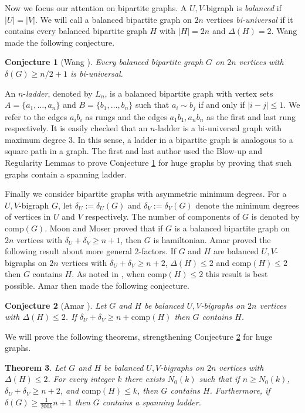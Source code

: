 \documentclass[oneside,12pt]{memoir}
\newtheorem{theorem}{Theorem}[section]
\newtheorem{conjecture}[theorem]{Conjecture}
\begin{document}
Now we focus our attention on bipartite graphs. A $U,V$-bigraph
is \emph{balanced} if $|U|=|V|$. We will call a balanced bipartite
graph on $2n$ vertices \emph{bi-universal} if it contains every balanced
bipartite graph $H$ with $|H|=2n$ and $\Delta(H)=2$. Wang made the following conjecture.

\begin{conjecture}[Wang \cite{W1}]
\label{con:W1}Every balanced bipartite graph $G$ on $2n$ vertices with
$\delta(G)\geq n/2+1$ is bi-universal.
\end{conjecture}
An $n$-\emph{ladder}, denoted by $L_n$, is a balanced bipartite graph with vertex sets
$A=\{ a_{1},\dots,a_{n}\}$ and $B=\{ b_{1},\dots,b_{n}\}$
such that $a_{i}\sim b_{j}$ if and only if $\left|i-j\right|\leq1$. We refer
to the edges $a_{i}b_{i}$ as rungs and the edges $a_{1}b_{1},a_{n}b_{n}$
as the first and last rung respectively. It is easily checked 
that an $n$-ladder is a bi-universal graph with maximum degree $3$.  In this sense, a ladder in a bipartite graph is analogous to a square path in a graph. The first and last author \cite{CK} used the Blow-up and Regularity
Lemmas to prove Conjecture \ref{con:W1} for huge graphs by
proving that such graphs contain a spanning ladder.

Finally we consider bipartite graphs with asymmetric minimum degrees.
For a $U,V$-bigraph $G$, let $\delta_U:=\delta_U(G)$ and $\delta_V:=\delta_V(G)$ denote the minimum
degrees of vertices in $U$ and $V$ respectively. The number of components
of $G$ is denoted by $\mathrm{comp}(G)$. Moon and Moser \cite{MM}
proved that if $G$ is a balanced bipartite graph on $2n$ vertices
with $\delta_{U}+\delta_{V}\geq n+1$, then $G$ is hamiltonian. Amar \cite{A} proved the following result about more general 2-factors.  If $G$ and $H$ are balanced
$U,V$-bigraphs on $2n$ vertices with $\delta_{U}+\delta_{V}\geq n+2$, $\Delta(H)\leq 2$ and $\mathrm{comp}(H)\leq2$ then $G$ contains $H$. As noted in \cite{A}, when $\mathrm{comp}(H)\leq 2$ this result is best possible. Amar then made the following conjecture.

\begin{conjecture}[Amar \cite{A}]
\label{con:A}Let $G$ and $H$ be balanced $U,V$-bigraphs on $2n$
vertices with $\Delta(H)\leq 2$. If $\delta_{U}+\delta_{V}\geq n+\mathrm{comp}(H)
$ then $G$ contains $H$.
\end{conjecture}
We will prove the following theorems, strengthening Conjecture \ref{con:A}
for huge graphs.

\begin{theorem}\label{main} Let $G$ and $H$ be balanced $U,V$-bigraphs
on $2n$ vertices with $\Delta(H)\le2$. For every integer $k$ there
exists $N_0(k)$ such that if $n\geq N_0(k)$, $\delta_{U}+\delta_{V}\geq n+2$,
and $\mathrm{comp}(H)\le k$, then $G$ contains $H$. Furthermore,
if $\delta(G)\geq\frac{1}{200k}n+1$ then $G$ contains a spanning
ladder. 
\end{theorem}
\end{document}
